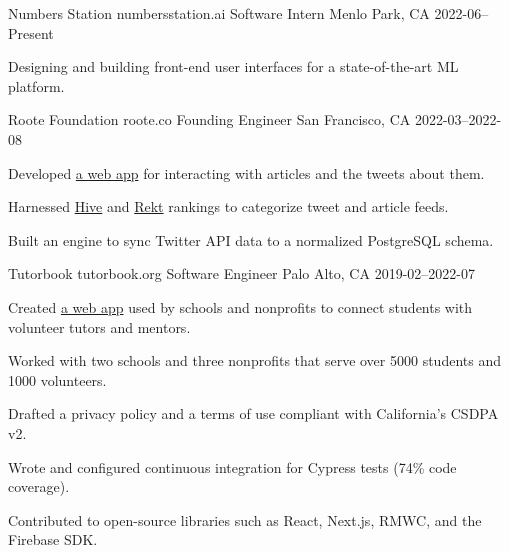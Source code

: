 

\begin{cventries}

  \cventry
    {Numbers Station} %
    {numbersstation.ai} %
    {Software Intern} %
    {Menlo Park, CA} %
    {2022-06–Present} %
    {
      \begin{cvitems} %
        \item {Designing and building front-end user interfaces for a state-of-the-art ML platform.}
      \end{cvitems}
    }

  \cventry
    {Roote Foundation} %
    {roote.co} %
    {Founding Engineer} %
    {San Francisco, CA} %
    {2022-03–2022-08} %
    {
      \begin{cvitems} %
        \item {Developed \href{https://github.com/rooteco/tweetscape}{a web app} for interacting with articles and the tweets about them.}
        \item {Harnessed \href{https://hive.one}{Hive} and \href{https://feed.rekt.news/parlor}{Rekt} rankings to categorize tweet and article feeds.}
        \item {Built an engine to sync Twitter API data to a normalized PostgreSQL schema.}
      \end{cvitems}
    }

  \cventry
    {Tutorbook} %
    {tutorbook.org} %
    {Software Engineer} %
    {Palo Alto, CA} %
    {2019-02–2022-07} %
    {
      \begin{cvitems} %
        \item {Created \href{https://github.com/tutorbookapp/tutorbook}{a web app} used by schools and nonprofits to connect students with volunteer tutors and mentors.}
        \item {Worked with two schools and three nonprofits that serve over 5000 students and 1000 volunteers.}
        \item {Drafted a privacy policy and a terms of use compliant with California's CSDPA v2.}
        \item {Wrote and configured continuous integration for Cypress tests (74\% code coverage).}
        \item {Contributed to open-source libraries such as React, Next.js, RMWC, and the Firebase SDK.}
      \end{cvitems}
    }


\end{cventries}

